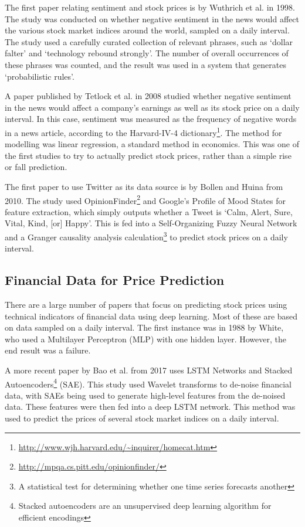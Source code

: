 \documentclass[12pt,a4paper,twoside,openright]{report}
\begin{document}
The first paper relating sentiment and stock prices is by Wuthrich et al. in 1998\cite{Wuthrich1998}. The study
was conducted on whether negative sentiment in the news would affect the various stock market indices around the world,
sampled on a daily interval.
The study used a carefully curated collection of relevant phrases, such as `dollar falter' and `technology
rebound strongly'. The number of overall occurrences of these phrases was counted, and the result was used
in a system that generates `probabilistic rules'.

A paper published by Tetlock et al. in 2008\cite{Tetlock08} studied whether negative sentiment in the news would affect 
a company's earnings as well as its stock price on a daily interval. In this case, sentiment was measured as the frequency 
of negative words in a news article, according to the Harvard-IV-4 
dictionary\footnote{\url{http://www.wjh.harvard.edu/~inquirer/homecat.htm}}.
The method for modelling was linear regression, a standard method in economics. This was one of the first studies to try
to actually predict stock prices, rather than a simple rise or fall prediction.

The first paper to use Twitter as its data source is by Bollen and Huina from 2010\cite{Bollen11}.
The study used OpinionFinder\footnote{\url{http://mpqa.cs.pitt.edu/opinionfinder/}} and Google's Profile of Mood States
for feature extraction, which simply outputs whether a Tweet is `Calm, Alert, Sure, Vital, Kind, [or] Happy'. 
This is fed into a Self-Organizing Fuzzy Neural Network and a Granger causality analysis calculation\footnote{A statistical test for determining
whether one time series forecasts another} to
predict stock prices on a daily interval.

\subsection{Financial Data for Price Prediction}

There are a large number of papers that focus on predicting stock prices using technical indicators of
financial data using deep learning. Most of these are based on data sampled on a daily interval.
The first instance was in 1988 by White, who used a Multilayer Perceptron (MLP) with one hidden layer.
However, the end result was a failure\cite{White98}.

A more recent paper by Bao et al. from 2017 uses LSTM Networks and Stacked Autoencoders\footnote{Stacked autoencoders are an unsupervised deep learning
algorithm for efficient encodings} (SAE)\cite{Bao17}.
This study used Wavelet transforms to de-noise financial data, with SAEs being used to
generate high-level features from the de-noised data. These features were then fed into a deep LSTM network. This method
was used to predict the prices of several stock market indices on a daily interval.
\end{document}
